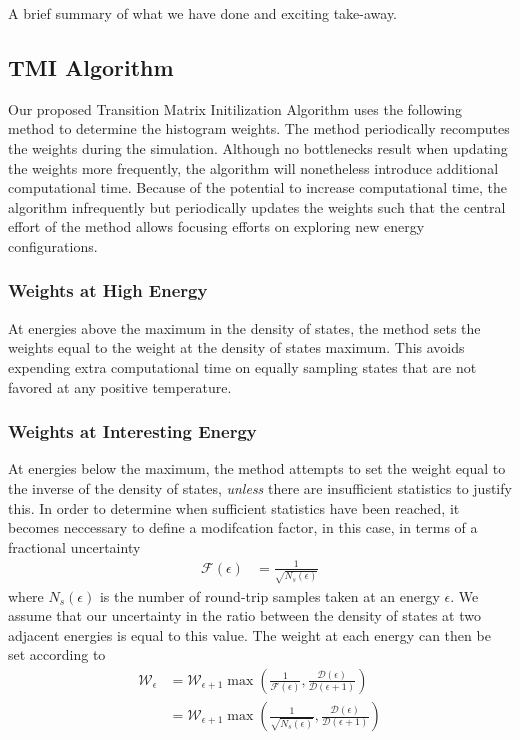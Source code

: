 \documentclass[letterpaper,twocolumn,amsmath,amssymb,pre,aps,10pt]{revtex4-1}
\begin{document}
A brief summary of what we have done and exciting take-away.


\subsection{TMI Algorithm}

Our proposed Transition Matrix Initilization Algorithm uses the following 
method to determine the histogram weights.  The method periodically recomputes 
the weights during the simulation.  Although no bottlenecks result when updating 
the weights more frequently, the algorithm will nonetheless introduce additional 
computational time.  Because of the potential to increase computational time, the 
algorithm infrequently but periodically updates the weights such that the central
effort of the method allows focusing efforts on exploring new energy
configurations.

\subsubsection{Weights at High Energy}
At energies above the maximum in the density of states, the method sets the weights 
equal to the weight at the density of states maximum.  This avoids expending 
extra computational time on equally sampling states that are not favored at any 
positive temperature.

\subsubsection{Weights at Interesting Energy}
At energies below the maximum, the method attempts to set the weight equal to the 
inverse of the density of states, \emph{unless} there are insufficient statistics 
to justify this.  In order to determine when sufficient statistics have been reached,
it becomes neccessary to define a modifcation factor, in this case, in terms of a 
fractional uncertainty
\begin{align}
  \mathcal{F}(\epsilon) &= \frac{1}{\sqrt{N_s(\epsilon)}}
\end{align}
where $N_s(\epsilon)$ is the number of round-trip samples taken at an energy
$\epsilon$.  We assume that our uncertainty in the ratio between the density
of states at two adjacent energies is equal to this value.  The weight at each
energy can then be set according to
\begin{align}
  \mathcal{W}_{\epsilon} &= \mathcal{W}_{\epsilon+1}\max\left(\frac1{\mathcal{F}
  (\epsilon)},\frac{\mathcal{D}(\epsilon)}{\mathcal{D}(\epsilon+1)}\right)
  \\
   &= \mathcal{W}_{\epsilon+1}\max\left(\frac1{\sqrt{N_s(\epsilon)}},
  \frac{\mathcal{D}(\epsilon)}{\mathcal{D}(\epsilon+1)}\right)
\end{align}
\end{document}
